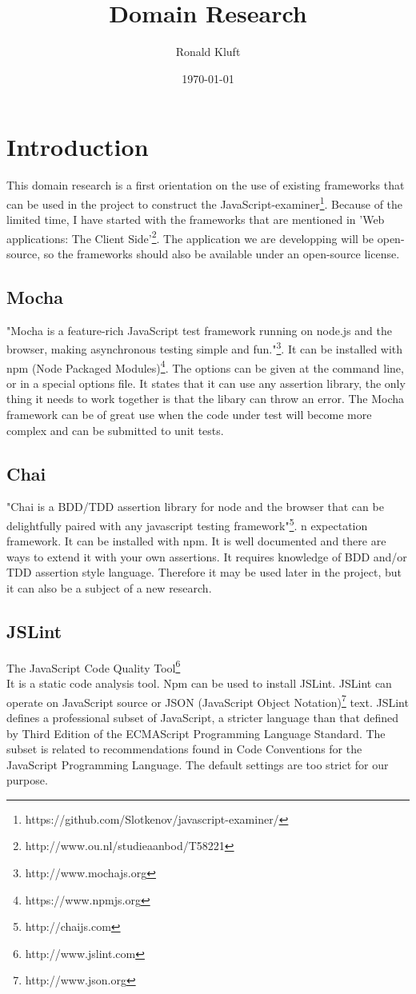 \documentclass{article}
\begin{document}
\title{Domain Research}
\author{Ronald Kluft}
\date{\today}
\maketitle

\section{Introduction}
This domain research is a first orientation on the use of existing frameworks that can be used in the 
project to construct the JavaScript-examiner\footnote{https://github.com/Slotkenov/javascript-examiner/}.
Because of the limited time, I have started with the frameworks that are mentioned in 
'Web applications: The Client Side'\footnote{http://www.ou.nl/studieaanbod/T58221}.
The application we are developping will be open-source, so the frameworks should also be available
under an open-source license.

\subsection{Mocha}
"Mocha is a feature-rich JavaScript test framework running on node.js and the 
browser, making asynchronous testing simple and fun."\footnote{http://www.mochajs.org}.
It can be installed with npm (Node Packaged Modules)\footnote{https://www.npmjs.org}.
The options can be given at the command line, or in a special options file.
It states that it can use any assertion library, the only thing it needs to work together is that the libary can throw an error.
The Mocha framework can be of great use when the code under test will become more complex and can be submitted to unit tests.


\subsection{Chai}
"Chai is a BDD/TDD assertion library for node and the browser that can be delightfully paired with any javascript testing framework"\footnote{http://chaijs.com}.
n expectation framework. It can be installed with npm.
It is well documented and there are ways to extend it with your own assertions.
It requires knowledge of BDD and/or TDD assertion style language.
Therefore it may be used later in the project, but it can also be a subject of a new research.


\subsection{JSLint}
The JavaScript Code Quality Tool\footnote{http://www.jslint.com}\\
It is a static code analysis tool.
Npm can be used to install JSLint.
JSLint can operate on JavaScript source or JSON (JavaScript Object Notation)\footnote {http://www.json.org} text.
JSLint defines a professional subset of JavaScript, a stricter language than that defined by Third Edition of the ECMAScript Programming Language Standard.
The subset is related to recommendations found in Code Conventions for the JavaScript Programming Language.
The default settings are too strict for our purpose.
\end{document}
